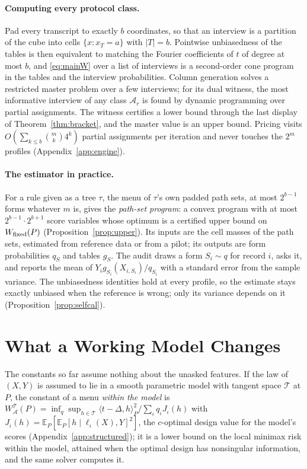 \documentclass{article}
\newcommand{\E}{\mathbb{E}}
\newcommand{\A}{\mathcal A}
\begin{document}
\paragraph{Computing every protocol class.}
Pad every transcript to exactly $b$ coordinates, so that an interview is a partition of the cube into cells $\{x:x_T=a\}$ with $|T|=b$. Pointwise unbiasedness of the tables is then equivalent to matching the Fourier coefficients of $t$ of degree at most $b$, and \eqref{eq:mainW} over a list of interviews is a second-order cone program in the tables and the interview probabilities. Column generation solves a restricted master problem over a few interviews; for its dual witness, the most informative interview of any class $\A_r$ is found by dynamic programming over partial assignments. The witness certifies a lower bound through the last display of Theorem~\ref{thm:bracket}, and the master value is an upper bound. Pricing visits $O(\sum_{k\le b}\binom mk4^k)$ partial assignments per iteration and never touches the $2^m$ profiles (Appendix~\ref{app:engine}).

\paragraph{The estimator in practice.} For a rule given as a tree $\tau$, the menu of $\tau$'s own padded path sets, at most $2^{b-1}$ forms whatever $m$ is, gives the \emph{path-set program}: a convex program with at most $2^{b-1}\cdot2^{b+1}$ score variables whose optimum is a certified upper bound on $W_{\rm fixed}(P)$ (Proposition~\ref{prop:upper}). Its inputs are the cell masses of the path sets, estimated from reference data or from a pilot; its outputs are form probabilities $q_S$ and tables $g_S$. The audit draws a form $S_i\sim q$ for record $i$, asks it, and reports the mean of $Y_ig_{S_i}(X_{i,S_i})/q_{S_i}$ with a standard error from the sample variance. The unbiasedness identities hold at every profile, so the estimate stays exactly unbiased when the reference is wrong; only its variance depends on it (Proposition~\ref{prop:selfcal}).

\section{What a Working Model Changes}\label{sec:model}
The constants so far assume nothing about the unasked features. If the law of $(X,Y)$ is assumed to lie in a smooth parametric model with tangent space $\mathcal T$ at $P$, the constant of a menu \emph{within the model} is $W^{\mathcal T}_\A(P)=\inf_q\sup_{h\in\mathcal T}\langle t-\Delta,h\rangle_P^2/\sum_\iota q_\iota J_\iota(h)$ with $J_\iota(h)=\E_P[\E_P[h\mid\ell_\iota(X),Y]^2]$, the $c$-optimal design value for the model's scores (Appendix~\ref{app:structured}); it is a lower bound on the local minimax risk within the model, attained when the optimal design has nonsingular information, and the same solver computes it.
\end{document}
